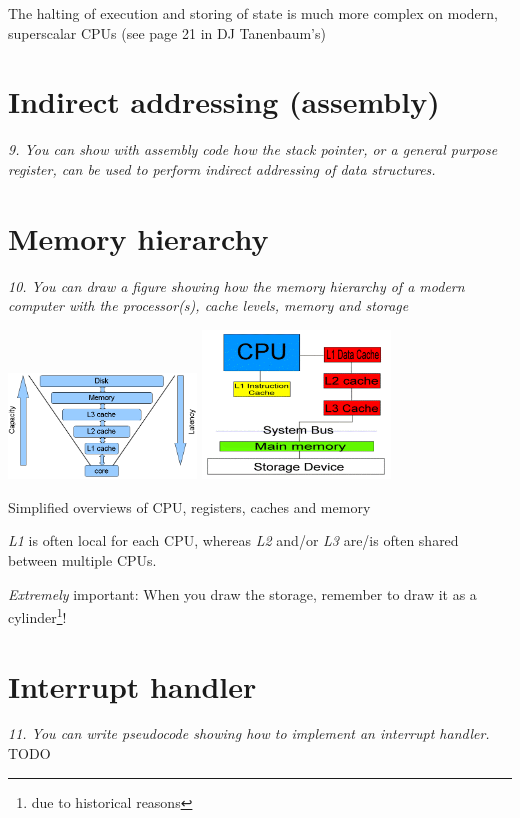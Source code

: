 \documentclass{article}
\begin{document}
The halting of execution and storing of state is much more complex on modern, superscalar CPUs (see page 21 in DJ Tanenbaum's)


\section{Indirect addressing (assembly)}
\emph{9. You can show with assembly code how the stack pointer, or a general purpose register, can be used to perform indirect addressing of data structures.}



\section{Memory hierarchy}
\emph{10. You can draw a figure showing how the memory hierarchy of a modern computer with the processor(s), cache levels, memory and storage}

\begin{center}
\includegraphics[width=5.0cm]{images/cpu_cache_structure.png}
\includegraphics[width=5.0cm]{images/CPU-Cache-System.png}

Simplified overviews of CPU, registers, caches and memory
\end{center}

\emph{L1} is often local for each CPU, whereas \emph{L2} and/or \emph{L3} are/is often shared between multiple CPUs.

\emph{Extremely} important: When you draw the storage, remember to draw it as a cylinder\footnote{due to historical reasons}!


\section{Interrupt handler}
\emph{11. You can write pseudocode showing how to implement an interrupt handler.}
TODO
\end{document}
